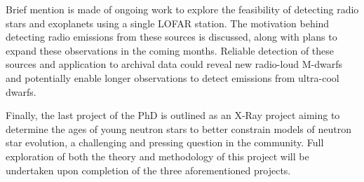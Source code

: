 Brief mention is made of ongoing work to explore the feasibility of detecting radio stars and exoplanets using a single LOFAR station. The motivation behind detecting radio emissions from these sources is discussed, along with plans to expand these observations in the coming months. Reliable detection of these sources and application to archival data could reveal new radio-loud M-dwarfs and potentially enable longer observations to detect emissions from ultra-cool dwarfs.

Finally, the last project of the PhD is outlined as an X-Ray project aiming to determine the ages of young neutron stars to better constrain models of neutron star evolution, a challenging and pressing question in the community. Full exploration of both the theory and methodology of this project will be undertaken upon completion of the three aforementioned projects.

